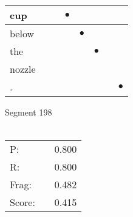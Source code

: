 \documentclass[landscape]{article}
\newcommand{\ssp}{\hspace{2pt}}
\newcommand{\mex}{\cellcolor{g}$\bullet$}
\begin{document}
\begin{tabular}{|l|p{10pt}|p{10pt}|p{10pt}|p{10pt}|p{10pt}|p{10pt}|p{10pt}|}
\hline
\ssp \cellcolor{ref2}cup \ssp&\hspace{2pt}&\hspace{2pt}&\hspace{2pt}\mex&\hspace{2pt}&\hspace{2pt}&\hspace{2pt}&\hspace{2pt}\\
\hline
\ssp \cellcolor{ref3}below \ssp&\hspace{2pt}&\hspace{2pt}&\hspace{2pt}&\hspace{2pt}\mex&\hspace{2pt}&\hspace{2pt}&\hspace{2pt}\\
\hline
\ssp \cellcolor{ref4}the \ssp&\hspace{2pt}&\hspace{2pt}&\hspace{2pt}&\hspace{2pt}&\hspace{2pt}\mex&\hspace{2pt}&\hspace{2pt}\\
\hline
\ssp nozzle \ssp&\hspace{2pt}&\hspace{2pt}&\hspace{2pt}&\hspace{2pt}&\hspace{2pt}&\hspace{2pt}&\hspace{2pt}\\
\hline
\ssp \cellcolor{ref6}. \ssp&\hspace{2pt}&\hspace{2pt}&\hspace{2pt}&\hspace{2pt}&\hspace{2pt}&\hspace{2pt}&\hspace{2pt}\mex\\
\hline
\end{tabular}

\vspace{6pt}
\noindent Segment 198\\\\
\noindent\begin{tabular}{lm{12pt}r}
\hline
P:&&0.800\\
R:&&0.800\\
Frag:&&0.482\\
Score:&&0.415\\
\end{tabular}
\end{document}
